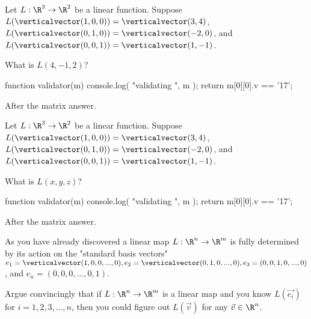 \documentclass{ximera}
\begin{document}
\begin{question}
  Let $L:\R^3 \to \R^2$ be a linear function.  Suppose $L(\verticalvector(1,0,0)) = \verticalvector(3,4)$, 
  $L(\verticalvector(0,1,0)) = \verticalvector(-2,0)$,  and  $L(\verticalvector(0,0,1)) = \verticalvector(1,-1)$.
  
  \begin{solution}
    What is $L (4,-1,2)$?

    \begin{matrix-answer}[name=M]
      function validator(m) {
        console.log( "validating ", m );
        return m[0][0].v == '17';
      }
    \end{matrix-answer}
    
    After the matrix answer.
  \end{solution}
\end{question}


\begin{question}
  Let $L:\R^3 \to \R^2$ be a linear function.  Suppose $L(\verticalvector(1,0,0)) = \verticalvector(3,4)$, 
  $L(\verticalvector(0,1,0)) = \verticalvector(-2,0)$,  and  $L(\verticalvector(0,0,1)) = \verticalvector(1,-1)$.
  
  \begin{solution}
    What is $L(x,y,z)$?

    \begin{matrix-answer}[name=M]
      function validator(m) {
        console.log( "validating ", m );
        return m[0][0].v == '17';
      }
    \end{matrix-answer}
    
    After the matrix answer.
  \end{solution}

\end{question}

As you have already discovered a linear map $L: \R^n \to \R^m$ is
fully determined by its action on the "standard basis vectors" $e_1 =
\verticalvector(1,0,0,...,0), e_2 = \verticalvector(0,1,0,...,0), e_3
= (0,0,1,0,...,0)$, and $e_n = (0,0,0,...,0,1)$.

\begin{free-response}
  Argue convincingly that if $L:\R^n \to\R^m$ is a linear map and you know $L(\vec{e_i})$ for $i=1,2,3,...,n$, then you could figure out $L(\vec{v})$ for
  any $\vec{v} \in \R^n$.
\end{free-response}
\end{document}
